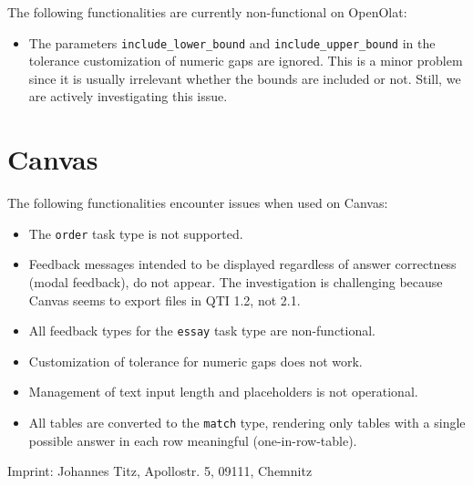 \documentclass[twoside]{tufte-book}
\newcommand{\blankpage}{\newpage\hbox{}\thispagestyle{empty}\newpage}
\providecommand{\tightlist}{%
  \setlength{\itemsep}{0pt}\setlength{\parskip}{0pt}}
\begin{document}
The following functionalities are currently non-functional on OpenOlat:

\begin{itemize}
\tightlist
\item
  The parameters \texttt{include\_lower\_bound} and \texttt{include\_upper\_bound} in the tolerance customization of numeric gaps are ignored. This is a minor problem since it is usually irrelevant whether the bounds are included or not. Still, we are actively investigating this issue.
\end{itemize}

\section{Canvas}\label{canvas}

The following functionalities encounter issues when used on Canvas:

\begin{itemize}
\tightlist
\item
  The \texttt{order} task type is not supported.
\item
  Feedback messages intended to be displayed regardless of answer correctness (modal feedback), do not appear. The investigation is challenging because Canvas seems to export files in QTI 1.2, not 2.1.
\item
  All feedback types for the \texttt{essay} task type are non-functional.
\item
  Customization of tolerance for numeric gaps does not work.
\item
  Management of text input length and placeholders is not operational.
\item
  All tables are converted to the \texttt{match} type, rendering only tables with a single possible answer in each row meaningful (one-in-row-table).
\end{itemize}

\blankpage
\blankpage
\fancyhead{}
\renewcommand{\headrulewidth}{0pt}%
Imprint: Johannes Titz, Apollostr. 5, 09111, Chemnitz
\end{document}

